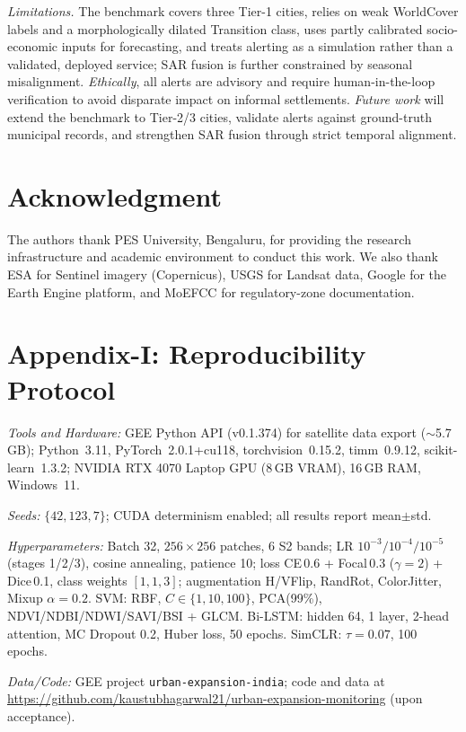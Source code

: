 \documentclass[conference]{IEEEtran}
\begin{document}
\emph{Limitations.} The benchmark covers three Tier-1 cities, relies on weak WorldCover labels and a morphologically dilated Transition class, uses partly calibrated socio-economic inputs for forecasting, and treats alerting as a simulation rather than a validated, deployed service; SAR fusion is further constrained by seasonal misalignment. \emph{Ethically}, all alerts are advisory and require human-in-the-loop verification to avoid disparate impact on informal settlements. \emph{Future work} will extend the benchmark to Tier-2/3 cities, validate alerts against ground-truth municipal records, and strengthen SAR fusion through strict temporal alignment.

\section*{Acknowledgment}

The authors thank PES University, Bengaluru, for providing the research infrastructure and academic environment to conduct this work. We also thank ESA for Sentinel imagery (Copernicus), USGS for Landsat data, Google for the Earth Engine platform, and MoEFCC for regulatory-zone documentation.

\appendix
\section*{Appendix-I: Reproducibility Protocol}
\label{appendix:repro}

\emph{Tools and Hardware:} GEE Python API (v0.1.374) for satellite data export ($\sim$5.7\,GB); Python~3.11, PyTorch~2.0.1+cu118, torchvision~0.15.2, timm~0.9.12, scikit-learn~1.3.2; NVIDIA RTX 4070 Laptop GPU (8\,GB VRAM), 16\,GB RAM, Windows~11.

\emph{Seeds:} $\{42, 123, 7\}$; CUDA determinism enabled; all results report mean$\pm$std.

\emph{Hyperparameters:} Batch 32, $256{\times}256$ patches, 6 S2 bands; LR $10^{-3}/10^{-4}/10^{-5}$ (stages 1/2/3), cosine annealing, patience 10; loss CE\,0.6 + Focal\,0.3 ($\gamma{=}2$) + Dice\,0.1, class weights $[1,1,3]$; augmentation H/VFlip, RandRot, ColorJitter, Mixup $\alpha{=}0.2$. SVM: RBF, $C{\in}\{1,10,100\}$, PCA(99\%), NDVI/NDBI/NDWI/SAVI/BSI + GLCM. Bi-LSTM: hidden 64, 1 layer, 2-head attention, MC Dropout 0.2, Huber loss, 50 epochs. SimCLR: $\tau{=}0.07$, 100 epochs.

\emph{Data/Code:} GEE project \texttt{urban-expansion-india}; code and data at \url{https://github.com/kaustubhagarwal21/urban-expansion-monitoring} (upon acceptance).

\balance


\end{document}
